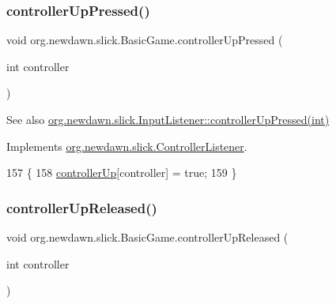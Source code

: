 \subsubsection{\texorpdfstring{controller\+Up\+Pressed()}{controllerUpPressed()}}
{\footnotesize\ttfamily void org.\+newdawn.\+slick.\+Basic\+Game.\+controller\+Up\+Pressed (\begin{DoxyParamCaption}\item[{int}]{controller }\end{DoxyParamCaption})\hspace{0.3cm}{\ttfamily [inline]}}

\begin{DoxySeeAlso}{See also}
\mbox{\hyperlink{interfaceorg_1_1newdawn_1_1slick_1_1_controller_listener_a7cb917761de1e555b23469042b6f1e03}{org.\+newdawn.\+slick.\+Input\+Listener\+::controller\+Up\+Pressed(int)}} 
\end{DoxySeeAlso}


Implements \mbox{\hyperlink{interfaceorg_1_1newdawn_1_1slick_1_1_controller_listener_a7cb917761de1e555b23469042b6f1e03}{org.\+newdawn.\+slick.\+Controller\+Listener}}.


\begin{DoxyCode}
157                                                     \{
158         \mbox{\hyperlink{classorg_1_1newdawn_1_1slick_1_1_basic_game_ac57500e9873e5634ed07cdba8b9c1d58}{controllerUp}}[controller] = \textcolor{keyword}{true};
159     \}
\end{DoxyCode}
\mbox{\label{classorg_1_1newdawn_1_1slick_1_1_basic_game_a3fc92fc64da3e17cac17c1110d5b7237}} 
\subsubsection{\texorpdfstring{controller\+Up\+Released()}{controllerUpReleased()}}
{\footnotesize\ttfamily void org.\+newdawn.\+slick.\+Basic\+Game.\+controller\+Up\+Released (\begin{DoxyParamCaption}\item[{int}]{controller }\end{DoxyParamCaption})\hspace{0.3cm}{\ttfamily [inline]}}

